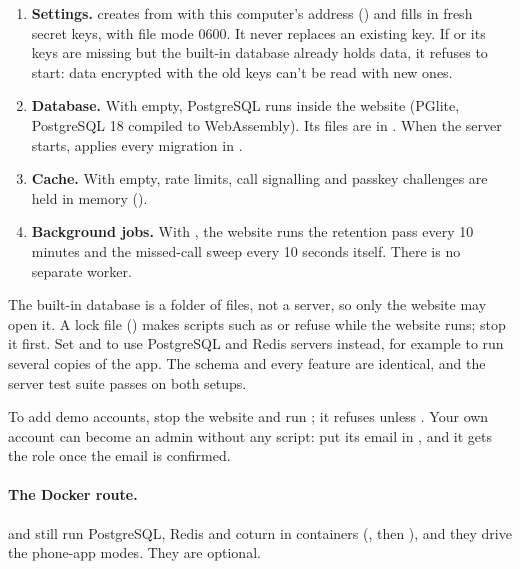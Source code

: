 \begin{enumerate}
\item \textbf{Settings.}  creates  from  with this computer's address () and fills in fresh secret keys, with file mode 0600. It never replaces an existing key. If  or its keys are missing but the built-in database already holds data, it refuses to start: data encrypted with the old keys can't be read with new ones.
\item \textbf{Database.} With  empty, PostgreSQL runs inside the website (PGlite, PostgreSQL 18 compiled to WebAssembly). Its files are in . When the server starts,  applies every migration in .
\item \textbf{Cache.} With  empty, rate limits, call signalling and passkey challenges are held in memory ().
\item \textbf{Background jobs.} With , the website runs the retention pass every 10 minutes and the missed-call sweep every 10 seconds itself. There is no separate worker.
\end{enumerate}

\begin{note}
The built-in database is a folder of files, not a server, so only the website may open it. A lock file () makes scripts such as  or  refuse while the website runs; stop it first. Set  and  to use PostgreSQL and Redis servers instead, for example to run several copies of the app. The schema and every feature are identical, and the server test suite passes on both setups.
\end{note}

To add demo accounts, stop the website and run ; it refuses unless . Your own account can become an admin without any script: put its email in , and it gets the role once the email is confirmed.

\paragraph{The Docker route.}  and  still run PostgreSQL, Redis and coturn in containers (, then ), and they drive the phone-app modes. They are optional.

